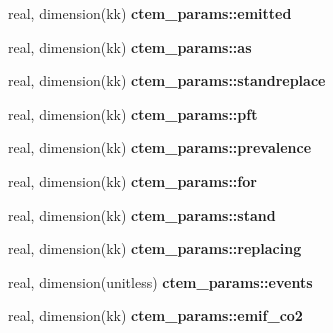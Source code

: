 \begin{DoxyCompactItemize}
\item 
\hypertarget{namespacectem__params_a877f3bb92df7bd947fff2191f7c4d73e}{}real, dimension(kk) {\bfseries ctem\+\_\+params\+::emitted}\label{namespacectem__params_a877f3bb92df7bd947fff2191f7c4d73e}

\item 
\hypertarget{namespacectem__params_aee5208cb0c63b9a9def55fe86b17832b}{}real, dimension(kk) {\bfseries ctem\+\_\+params\+::as}\label{namespacectem__params_aee5208cb0c63b9a9def55fe86b17832b}

\item 
\hypertarget{namespacectem__params_a5086cd6fb3b85a2882e7aa2683598f9b}{}real, dimension(kk) {\bfseries ctem\+\_\+params\+::standreplace}\label{namespacectem__params_a5086cd6fb3b85a2882e7aa2683598f9b}

\item 
\hypertarget{namespacectem__params_aabc4d5c25d736722228235162c08cba8}{}real, dimension(kk) {\bfseries ctem\+\_\+params\+::pft}\label{namespacectem__params_aabc4d5c25d736722228235162c08cba8}

\item 
\hypertarget{namespacectem__params_ad4b0f2dcab01bae36142006831083a0a}{}real, dimension(kk) {\bfseries ctem\+\_\+params\+::prevalence}\label{namespacectem__params_ad4b0f2dcab01bae36142006831083a0a}

\item 
\hypertarget{namespacectem__params_a7a51580df85560c9e228b6326744842b}{}real, dimension(kk) {\bfseries ctem\+\_\+params\+::for}\label{namespacectem__params_a7a51580df85560c9e228b6326744842b}

\item 
\hypertarget{namespacectem__params_aa5d12be46067e1059aecb53c7d92089c}{}real, dimension(kk) {\bfseries ctem\+\_\+params\+::stand}\label{namespacectem__params_aa5d12be46067e1059aecb53c7d92089c}

\item 
\hypertarget{namespacectem__params_aca98330fb129b05e7c187a28538ded91}{}real, dimension(kk) {\bfseries ctem\+\_\+params\+::replacing}\label{namespacectem__params_aca98330fb129b05e7c187a28538ded91}

\item 
\hypertarget{namespacectem__params_a054134d8a3015cd2b34e6d035f138a27}{}real, dimension(unitless) {\bfseries ctem\+\_\+params\+::events}\label{namespacectem__params_a054134d8a3015cd2b34e6d035f138a27}

\item 
\hypertarget{namespacectem__params_a07af3ba9ecabbbac0d884937d56e1b7a}{}real, dimension(kk) {\bfseries ctem\+\_\+params\+::emif\+\_\+co2}\label{namespacectem__params_a07af3ba9ecabbbac0d884937d56e1b7a}


\end{DoxyCompactItemize}

